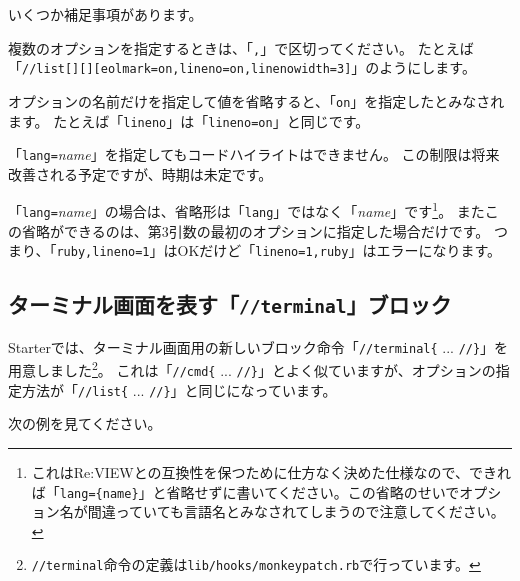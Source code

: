 いくつか補足事項があります。

\begin{starteritemize}
\item 複数のオプションを指定するときは、「\texttt{,}」で区切ってください。
   たとえば「\texttt{//list[][][eolmark=on,lineno=on,linenowidth=3]}」のようにします。
\item オプションの名前だけを指定して値を省略すると、「\texttt{on}」を指定したとみなされます。
   たとえば「\texttt{lineno}」は「\texttt{lineno=on}」と同じです。
\item 「\texttt{lang=}\textit{name}」を指定してもコードハイライトはできません。
   この制限は将来改善される予定ですが、時期は未定です。
\item 「\texttt{lang=}\textit{name}」の場合は、省略形は「\texttt{lang}」ではなく「\textit{name}」です\footnote{これはRe:VIEWとの互換性を保つために仕方なく決めた仕様なので、できれば「\texttt{lang=\{name\}}」と省略せずに書いてください。この省略のせいでオプション名が間違っていても言語名とみなされてしまうので注意してください。}。
   またこの省略ができるのは、第3引数の最初のオプションに指定した場合だけです。
   つまり、「\texttt{ruby,lineno=1}」はOKだけど「\texttt{lineno=1,ruby}」はエラーになります。
\end{starteritemize}

\begin{starterprogram}\end{starterprogram}

\subsection*{ターミナル画面を表す「\texttt{//terminal}」ブロック}
\label{sec:1-1-6}

Starterでは、ターミナル画面用の新しいブロック命令「\texttt{//terminal\{} ... \texttt{//\}}」を用意しました\footnote{\texttt{//terminal}命令の定義は\texttt{lib/hooks/monkeypatch.rb}で行っています。}。
これは「\texttt{//cmd\{} ... \texttt{//\}}」とよく似ていますが、オプションの指定方法が「\texttt{//list\{} ... \texttt{//\}}」と同じになっています。

次の例を見てください。

